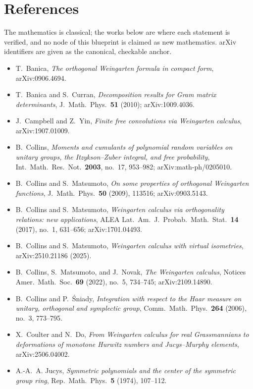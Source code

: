 \chapter{References}\label{ch:references}

The mathematics is classical; the works below are where each statement is
verified, and no node of this blueprint is claimed as new mathematics. arXiv
identifiers are given as the canonical, checkable anchor.

\begin{itemize}
\item T.~Banica, \emph{The orthogonal Weingarten formula in compact form}, arXiv:0906.4694.
\item T.~Banica and S.~Curran, \emph{Decomposition results for Gram matrix determinants}, J.\ Math.\ Phys.\ \textbf{51} (2010); arXiv:1009.4036.
\item J.~Campbell and Z.~Yin, \emph{Finite free convolutions via Weingarten calculus}, arXiv:1907.01009.
\item B.~Collins, \emph{Moments and cumulants of polynomial random variables on unitary groups, the Itzykson--Zuber integral, and free probability}, Int.\ Math.\ Res.\ Not.\ \textbf{2003}, no.~17, 953--982; arXiv:math-ph/0205010.
\item B.~Collins and S.~Matsumoto, \emph{On some properties of orthogonal Weingarten functions}, J.\ Math.\ Phys.\ \textbf{50} (2009), 113516; arXiv:0903.5143.
\item B.~Collins and S.~Matsumoto, \emph{Weingarten calculus via orthogonality relations: new applications}, ALEA Lat.\ Am.\ J.\ Probab.\ Math.\ Stat.\ \textbf{14} (2017), no.~1, 631--656; arXiv:1701.04493.
\item B.~Collins and S.~Matsumoto, \emph{Weingarten calculus with virtual isometries}, arXiv:2510.21186 (2025).
\item B.~Collins, S.~Matsumoto, and J.~Novak, \emph{The Weingarten calculus}, Notices Amer.\ Math.\ Soc.\ \textbf{69} (2022), no.~5, 734--745; arXiv:2109.14890.
\item B.~Collins and P.~\'Sniady, \emph{Integration with respect to the Haar measure on unitary, orthogonal and symplectic group}, Comm.\ Math.\ Phys.\ \textbf{264} (2006), no.~3, 773--795.
\item X.~Coulter and N.~Do, \emph{From Weingarten calculus for real Grassmannians to deformations of monotone Hurwitz numbers and Jucys--Murphy elements}, arXiv:2506.04002.
\item A.-A.~A. Jucys, \emph{Symmetric polynomials and the center of the symmetric group ring}, Rep.\ Math.\ Phys.\ \textbf{5} (1974), 107--112.

\end{itemize}
